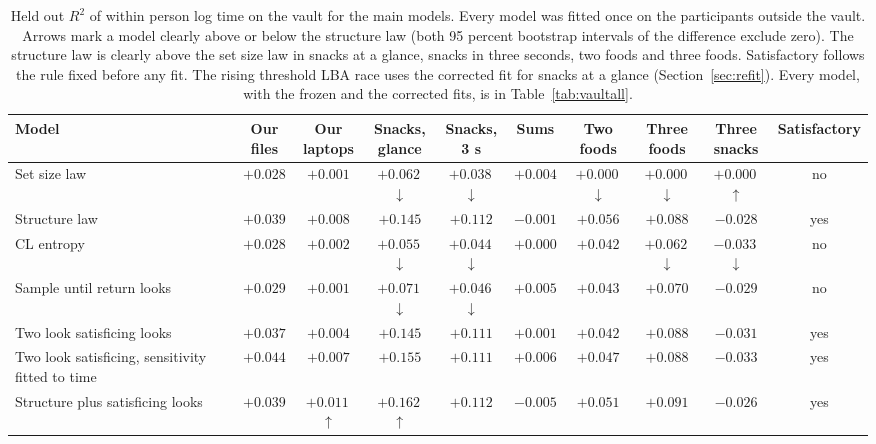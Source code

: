 \begin{table}[t]
\centering
\footnotesize
\setlength{\tabcolsep}{2.6pt}
\caption{Held out $R^2$ of within person log time on the vault for the main models. Every model was fitted once on the participants outside the vault. Arrows mark a model clearly above or below the structure law (both 95 percent bootstrap intervals of the difference exclude zero). The structure law is clearly above the set size law in snacks at a glance, snacks in three seconds, two foods and three foods. Satisfactory follows the rule fixed before any fit. The rising threshold LBA race uses the corrected fit for snacks at a glance (Section~\ref{sec:refit}). Every model, with the frozen and the corrected fits, is in Table~\ref{tab:vaultall}.}
\label{tab:vaultmain}
\begin{tabular}{>{\raggedright\arraybackslash}p{3.4cm}ccccccccc}
\toprule
Model & \makecell{Our\\files} & \makecell{Our\\laptops} & \makecell{Snacks,\\glance} & \makecell{Snacks,\\3 s} & Sums & \makecell{Two\\foods} & \makecell{Three\\foods} & \makecell{Three\\snacks} & Satisfactory \\
\midrule
Set size law & $+0.028$ & $+0.001$ & $+0.062$\,$\downarrow$ & $+0.038$\,$\downarrow$ & $+0.004$ & $+0.000$\,$\downarrow$ & $+0.000$\,$\downarrow$ & $+0.000$\,$\uparrow$ & no \\
Structure law & $+0.039$ & $+0.008$ & $+0.145$ & $+0.112$ & $-0.001$ & $+0.056$ & $+0.088$ & $-0.028$ & yes \\
CL entropy & $+0.028$ & $+0.002$ & $+0.055$\,$\downarrow$ & $+0.044$\,$\downarrow$ & $+0.000$ & $+0.042$ & $+0.062$\,$\downarrow$ & $-0.033$\,$\downarrow$ & no \\
Sample until return looks & $+0.029$ & $+0.001$ & $+0.071$\,$\downarrow$ & $+0.046$\,$\downarrow$ & $+0.005$ & $+0.043$ & $+0.070$ & $-0.029$ & no \\
Two look satisficing looks & $+0.037$ & $+0.004$ & $+0.145$ & $+0.111$ & $+0.001$ & $+0.042$ & $+0.088$ & $-0.031$ & yes \\
Two look satisficing, sensitivity fitted to time & $+0.044$ & $+0.007$ & $+0.155$ & $+0.111$ & $+0.006$ & $+0.047$ & $+0.088$ & $-0.033$ & yes \\
Structure plus satisficing looks & $+0.039$ & $+0.011$\,$\uparrow$ & $+0.162$\,$\uparrow$ & $+0.112$ & $-0.005$ & $+0.051$ & $+0.091$ & $-0.026$ & yes \\

\end{tabular}
\end{table}
